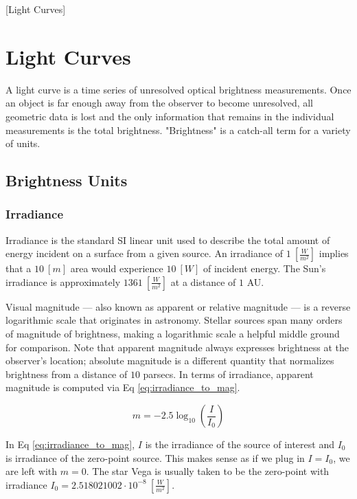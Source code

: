 [Light Curves]
\graphicspath{{/Users/liamrobinson/Documents/PyLightCurves/docs/build/html/_images}}

\chapter{Light Curves}

A light curve is a time series of unresolved optical brightness measurements. Once an object is far
enough away from the observer to become unresolved, all geometric data is lost and the only
information that remains in the individual measurements is the total brightness. "Brightness" is a
catch-all term for a variety of units. 

\section{Brightness Units}

\subsection{Irradiance}

Irradiance is the standard SI linear unit used to describe the total amount of energy incident on a
surface from a given source. An irradiance of $1 \: \left[ \frac{W}{m^2} \right]$ implies that a $10
\: [m]$ area would experience $10 \: [W]$ of incident energy. The Sun's irradiance is approximately
$1361 \: \left[ \frac{W}{m^2} \right]$ at a distance of $1$ AU. 

Visual magnitude ---  also known as apparent or relative magnitude ---  is a reverse logarithmic scale
that originates in astronomy. Stellar sources span many orders of magnitude of brightness, making a
logarithmic scale a helpful middle ground for comparison. Note that apparent magnitude always
expresses brightness at the observer's location; absolute magnitude is a different quantity that
normalizes brightness from a distance of $10$ parsecs. In terms of irradiance, apparent magnitude
is computed via Eq \ref{eq:irradiance_to_mag}.

\begin{equation} \label{eq:irradiance_to_mag}
  m = -2.5 \log_{10}\left( \frac{I}{I_0} \right)
\end{equation}

In Eq \ref{eq:irradiance_to_mag}, $I$ is the irradiance of the source of interest and $I_0$ is
irradiance of the zero-point source. This makes sense as if we plug in $I = I_0$, we are left with
$m=0$. The star Vega is usually taken to be the zero-point with irradiance $I_0 = 2.518021002\cdot
10^{-8} \: \left[ \frac{W}{m^2} \right]$.

